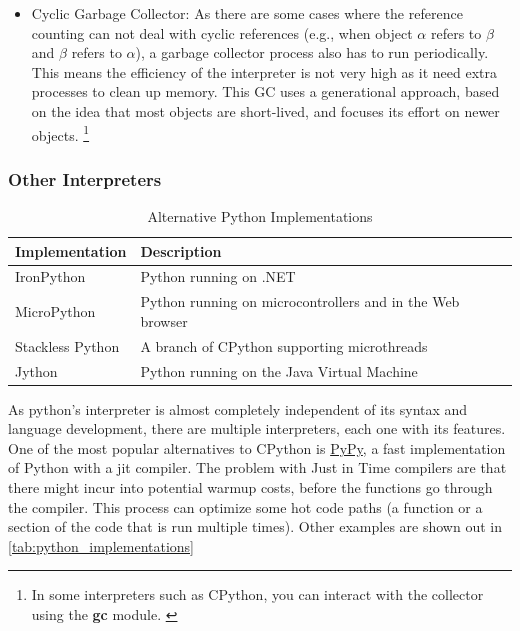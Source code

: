 \begin{enumerate}
\begin{enumerate}
\begin{itemize}
            \item Cyclic Garbage Collector: As there are some cases where the reference counting can not deal with cyclic references (e.g., when object $\alpha$ refers to $\beta$ and $\beta$ refers to $\alpha$), a garbage collector process also has to run periodically. This means the efficiency of the interpreter is not very high as it need extra processes to clean up memory. This \gls{GC} uses a generational approach, based on the idea that most objects are short-lived, and focuses its effort on newer objects. \footnote{In some interpreters such as \gls{CPython}, you can interact with the collector using the \textbf{gc} module. \cite{python-gc} } 
        \end{itemize}
    \end{enumerate}
\end{enumerate}





\subsubsection{Other Interpreters}

\begin{table}[h]
    \centering
    \caption{Alternative Python Implementations}
    \label{tab:python_implementations}
    \begin{tabular}{ll}
        \toprule
        \textbf{Implementation} & \textbf{Description} \\
        \midrule
        IronPython & Python running on .NET \\
        MicroPython & Python running on microcontrollers and in the Web browser \\
        Stackless Python & A branch of CPython supporting microthreads \\
        Jython & Python running on the Java Virtual Machine \\
        \bottomrule
    \end{tabular}
\end{table}

As python's interpreter is almost completely independent of its syntax and language development, there are multiple interpreters, each one with its features. One of the most popular alternatives to \gls{CPython} is \href{https://pypy.org/}{PyPy}, a fast implementation of Python with a \gls{jit} compiler. The problem with Just in Time compilers are that there might incur into potential warmup costs, before the functions go through the compiler. This process can optimize some hot code paths (a function or a section of the code that is run multiple times). Other examples are shown out in \autoref{tab:python_implementations}



